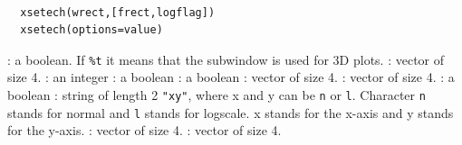 \begin{mandesc}
  \\ 
\end{mandesc}
\begin{calling_sequence}
\begin{verbatim}
  xsetech(wrect,[frect,logflag])  
  xsetech(options=value)
\end{verbatim}
\end{calling_sequence}
\begin{parameters}
  \begin{varlist}
    : a boolean. If \verb!%t! it means that the subwindow is used for 3D plots.
    : vector of size 4.
    : an integer 
    : a boolean 
    : a boolean 
    : vector of size 4.
    : vector of size 4.  
    : a boolean 
    : string of length 2 \verb!"xy"!, where x and y can be \verb!n! or 
    \verb!l!. Character \verb!n! stands for normal and \verb!l! stands for logscale. x stands
    for the x-axis and y stands for the y-axis.
    : vector of size 4.
    : vector of size 4.
  \end{varlist}
\end{parameters}

